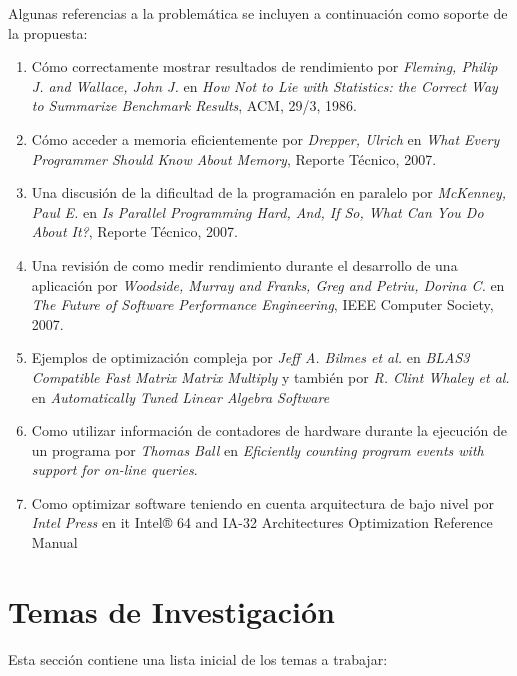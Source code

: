 \documentclass[a4paper]{article}
\begin{document}
\bigskip

Algunas referencias a la problemática se incluyen a continuación como soporte de la propuesta:

\begin{enumerate}

\item Cómo correctamente mostrar resultados de rendimiento por {\it Fleming, Philip J. and Wallace, John J.} en {\it How Not to Lie with Statistics: the Correct Way to Summarize Benchmark Results}, {ACM}, {29/3}, {1986}.

\item Cómo acceder a memoria eficientemente por {\it Drepper, Ulrich} en {\it What Every Programmer Should Know About Memory}, Reporte Técnico, 2007.

\item Una discusión de la dificultad de la programación en paralelo por {\it McKenney, Paul E.} en {\it Is Parallel Programming Hard, And, If So, What Can You Do About It?}, Reporte Técnico, 2007.

\item Una revisión de como medir rendimiento durante el desarrollo de una aplicación por {\it Woodside, Murray and Franks, Greg and Petriu, Dorina C.} en {\it The Future of Software Performance Engineering}, IEEE Computer Society, 2007.

\item Ejemplos de optimización compleja por {\it Jeff A. Bilmes et al.} en {\it BLAS3 Compatible Fast Matrix Matrix Multiply} y también por {\it R. Clint Whaley et al.} en {\it Automatically Tuned Linear Algebra Software}

\item Como utilizar información de contadores de hardware durante la ejecución de un programa por {\it Thomas Ball} en {\it Eficiently counting program events with support for on-line queries}.

\item Como optimizar software teniendo en cuenta arquitectura de bajo nivel por {\it Intel Press} en {it Intel® 64 and IA-32 Architectures Optimization Reference Manual}

\end{enumerate}

\section{Temas de Investigación}

Esta sección contiene una lista inicial de los temas a trabajar:
\end{document}
